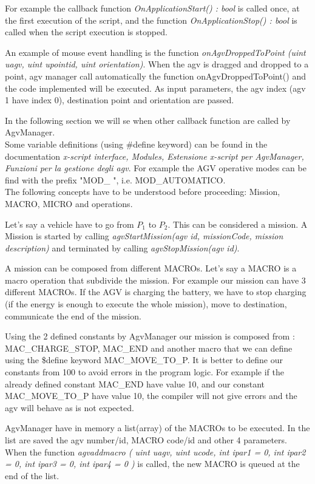 For example the callback function \textit{OnApplicationStart() : bool} is called once, at the first execution of the script, and the function \textit{OnApplicationStop() : bool} is called when the script execution is stopped.

An example of mouse event handling is the function \textit{onAgvDroppedToPoint (uint uagv, uint upointid, uint orientation)}.
When the agv is dragged and dropped to a point, agv manager call automatically the function onAgvDroppedToPoint() and the code implemented will be executed. As input parameters, the agv index (agv 1 have index 0), destination point and orientation are passed.

In the following section we will se when other callback function are called by AgvManager.\\

Some variable definitions (using \#define keyword) can be found in the documentation \textit{x-script interface, Modules, Estensione x-script per AgvManager, Funzioni per la gestione degli agv}. For example the AGV operative modes can be find with the prefix "MOD\_ ", i.e. MOD\_AUTOMATICO.\\

The following concepts have to be understood before proceeding: Mission, MACRO, MICRO and operations.

Let's say a vehicle have to go from $P_{1}$ to $P_{2}$. This can be considered a mission. A Mission is started by calling \textit{agvStartMission(agv id, missionCode, mission description)} and terminated by calling \textit{agvStopMission(agv id)}.

A mission can be composed from different MACROs. Let's say a MACRO is a macro operation that subdivide the mission. For example our mission can have 3 different MACROs. If the AGV is charging the battery, we have to stop charging (if the energy is enough to execute the whole mission), move to destination, communicate the end of the mission.

Using the 2 defined constants by AgvManager our mission is composed from : MAC\_CHARGE\_STOP, MAC\_END and another macro that we can define using the \$define keyword MAC\_MOVE\_TO\_P.
It is better to define our constants from 100 to avoid errors in the program logic. For example if the already defined constant MAC\_END have value 10, and our constant MAC\_MOVE\_TO\_P have value 10, the compiler will not give errors and the agv will behave as is not expected.

AgvManager have in memory a list(array) of the MACROs to be executed. In the list are saved the agv number/id, MACRO code/id and other 4 parameters. 
When the function 
\textit{agvaddmacro	(	uint 	uagv,
	uint 	ucode,
	int 	ipar1 = 0,
	int 	ipar2 = 0,
	int 	ipar3 = 0,
	int 	ipar4 = 0 
	)		} 
is called, the new MACRO is queued at the end of the list.

